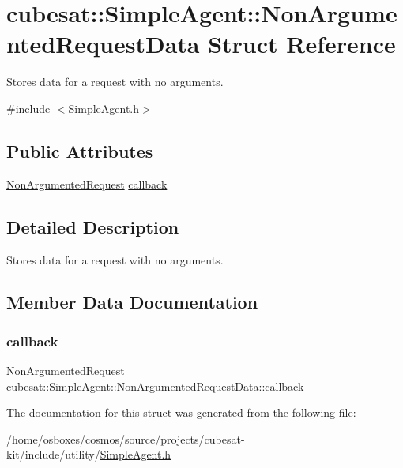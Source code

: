 \hypertarget{structcubesat_1_1SimpleAgent_1_1NonArgumentedRequestData}{}\section{cubesat\+:\+:Simple\+Agent\+:\+:Non\+Argumented\+Request\+Data Struct Reference}
\label{structcubesat_1_1SimpleAgent_1_1NonArgumentedRequestData}


Stores data for a request with no arguments.  




{\ttfamily \#include $<$Simple\+Agent.\+h$>$}

\subsection*{Public Attributes}
\begin{DoxyCompactItemize}
\item 
\hyperlink{namespacecubesat_a494b2feec3d999510e5772da5c0b354c}{Non\+Argumented\+Request} \hyperlink{structcubesat_1_1SimpleAgent_1_1NonArgumentedRequestData_abda7d359fbd1212e306fe42b6bb5923f}{callback}
\end{DoxyCompactItemize}


\subsection{Detailed Description}
Stores data for a request with no arguments. 

\subsection{Member Data Documentation}
\mbox{\label{structcubesat_1_1SimpleAgent_1_1NonArgumentedRequestData_abda7d359fbd1212e306fe42b6bb5923f}} 
\subsubsection{\texorpdfstring{callback}{callback}}
{\footnotesize\ttfamily \hyperlink{namespacecubesat_a494b2feec3d999510e5772da5c0b354c}{Non\+Argumented\+Request} cubesat\+::\+Simple\+Agent\+::\+Non\+Argumented\+Request\+Data\+::callback}



The documentation for this struct was generated from the following file\+:\begin{DoxyCompactItemize}
\item 
/home/osboxes/cosmos/source/projects/cubesat-\/kit/include/utility/\hyperlink{SimpleAgent_8h}{Simple\+Agent.\+h}\end{DoxyCompactItemize}
